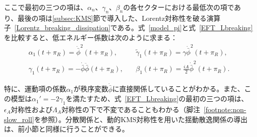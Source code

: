 ここで最初の三つの項は、$\alpha_n$、$\gamma_n$、$\beta_n$の各セクターにおける最低次の項であり、最後の項は\ref{subsec:KMS}節で導入した、Lorentz対称性を破る演算子~\eqref{Lorentz_breaking_dissipation}である。式~\eqref{model_pi}と式~\eqref{EFT_Lbreaking}を比較すると、低エネルギー係数は次のように求まる：
\begin{align}
\nonumber
\alpha_1(t+\pi_R)=\dot{\bar{\phi}}^2(t+\pi_R),& \quad \widetilde{\gamma}_1(t+\pi_R)=\gamma\dot{\bar{\phi}}^2(t+\pi_R),
\\
\gamma_1(t+\pi_R)=-\dot{\bar{\phi}}\ddot{\bar{\phi}}(t+\pi_R),& \quad \beta_1(t+\pi_R)=\frac{iA}{2}\dot{\bar{\phi}}^2(t+\pi_R).
\end{align}

特に、運動項の係数$\alpha_1$が秩序変数$\dot{\bar{\phi}}$に直接関係していることがわかる。また、この模型は$\alpha_1'=-2\gamma_1$を満たすため、式~\eqref{EFT_Lbreaking}の最初の三つの項は、$\epsilon_A$対称性および$\Lambda_A$対称性の下で不変であることもわかる（脚注~\ref{footnote:non-slow_roll}を参照）。分散関係と、動的KMS対称性を用いた揺動散逸関係の導出は、前小節と同様に行うことができる。

